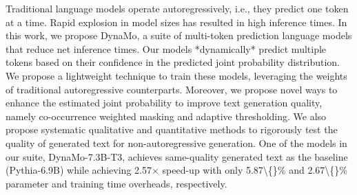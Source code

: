 Traditional language models operate autoregressively, i.e., they predict one token at a time. Rapid explosion in model  sizes has resulted in high inference times. In this work, we propose DynaMo, a suite of multi-token prediction language  models that reduce net inference times. Our models *dynamically* predict  multiple tokens based on their confidence in the predicted joint probability distribution. We propose a lightweight technique to train these models, leveraging the weights of traditional autoregressive counterparts. Moreover, we propose novel  ways to enhance the estimated joint probability to improve text generation quality, namely co-occurrence weighted masking  and adaptive thresholding. We also propose systematic qualitative and quantitative methods to rigorously test the quality of  generated text for non-autoregressive generation. One of the models in our suite, DynaMo-7.3B-T3, achieves same-quality  generated text as the baseline (Pythia-6.9B) while achieving 2.57$\times$ speed-up with only 5.87\textbackslash\{\}\% and 2.67\textbackslash\{\}\% parameter and training time  overheads, respectively.